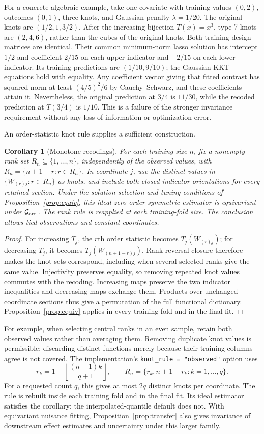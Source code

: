 \documentclass[11pt]{article}
\newtheorem{corollary}{Corollary}
\theoremstyle{definition}
\theoremstyle{remark}
\begin{document}
For a concrete algebraic example, take one covariate with training values
$(0,2)$, outcomes $(0,1)$, three knots, and Gaussian penalty $\lambda=1/20$.
The original knots are $(1/2,1,3/2)$. After the increasing bijection
$T(x)=x^3$, type-7 knots are $(2,4,6)$, rather than the cubes of the original
knots. Both training design matrices are identical. Their common
minimum-norm lasso solution has intercept $1/2$ and coefficient $2/15$ on
each upper indicator and $-2/15$ on each lower indicator. Its training
predictions are $(1/10,9/10)$; the Gaussian KKT equations hold with
equality. Any coefficient vector giving that fitted contrast has squared
norm at least $(4/5)^2/6$ by Cauchy--Schwarz, and these coefficients attain it.
Nevertheless, the original prediction at $3/4$ is $11/30$, while the
recoded prediction at $T(3/4)$ is $1/10$. This is a failure of the stronger
invariance requirement without any loss of information or optimization error.

An order-statistic knot rule supplies a sufficient construction.
\begin{corollary}[Monotone recodings]\label{cor:ordinal}
For each training size $n$, fix a nonempty rank set
$R_n\subseteq\{1,\ldots,n\}$, independently of the observed values, with
$R_n=\{n+1-r:r\in R_n\}$. In coordinate $j$, use the distinct values in
$\{W_{(r)j}:r\in R_n\}$ as knots, and include both closed indicator
orientations for every retained section. Under the solution-selection
and tuning conditions of Proposition~\ref{prop:equiv}, this ideal
zero-order symmetric estimator is equivariant under $\mathcal G_{\rm ord}$.
The rank rule is reapplied at each training-fold size. The conclusion
allows tied observations and constant coordinates.
\end{corollary}
\begin{proof}
For increasing $T_j$, the $r$th order statistic becomes $T_j(W_{(r)j})$;
for decreasing $T_j$, it becomes $T_j(W_{(n+1-r)j})$. Rank reversal closure
therefore makes the knot sets correspond, including when several selected
ranks give the same value. Injectivity preserves equality, so removing
repeated knot values commutes with the recoding. Increasing maps preserve
the two indicator inequalities and decreasing maps exchange them. Products
over unchanged coordinate sections thus give a permutation of the full
functional dictionary. Proposition~\ref{prop:equiv} applies in every
training fold and in the final fit.
\end{proof}
For example, when selecting central ranks in an even sample, retain both
observed values rather than averaging them. Removing duplicate knot values
is permissible; discarding distinct functions merely because their training
columns agree is not covered. The implementation's
\texttt{knot\_rule = "observed"} option uses
\[
 r_k=1+\left\lfloor\frac{(n-1)k}{q+1}\right\rfloor,\qquad
 R_n=\{r_k,n+1-r_k:k=1,\ldots,q\}.
\]
For a requested count $q$, this gives at most $2q$ distinct knots per
coordinate. The rule is rebuilt inside each training fold and in the final
fit. Its ideal estimator satisfies the corollary; the interpolated-quantile
default does not. With equivariant nuisance fitting,
Proposition~\ref{prop:transfer} also gives invariance of downstream effect
estimates and uncertainty under this larger family.
\end{document}
